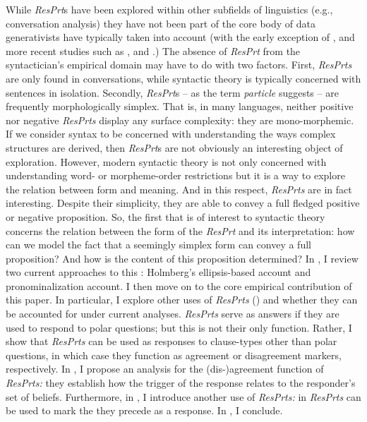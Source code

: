 \documentclass[output=paper]{LSP/langsci}
\begin{document}
While \textit{ResPrt}s have been explored within other subfields of linguistics (e.g., conversation analysis) they have not been part of the core body of data generativists have typically taken into account (with the early exception of \citealt{Pope1976}, and more recent studies such as \citealt{FarkasBruce2009,KramerRawlins2009}, and \citealt{Krifka2013}.) The absence of \textit{ResPrt} from the syntactician’s empirical domain may have to do with two factors. First, \textit{ResPrts} are only found in conversations, while syntactic theory is typically concerned with sentences in isolation. Secondly, \textit{ResPrt}s – as the term \textit{particle} suggests – are frequently morphologically simplex. That is, in many languages, neither positive nor negative \textit{ResPrts} display any surface complexity: they are mono-morphemic.
If we consider syntax to be concerned with understanding the ways complex structures are derived, then \textit{ResPrt}s are not obviously an interesting object of exploration. However, modern syntactic theory is not only concerned with understanding word- or morpheme-order restrictions but it is a way to explore the relation between form and meaning. And in this respect, \textit{ResPrts} are in fact interesting. Despite their  simplicity, they are able to convey a full fledged positive or negative proposition. So, the first  that is of interest to syntactic theory concerns the relation between the form of the \textit{ResPrt} and its interpretation: how can we model the fact that a seemingly simplex form can convey a full proposition? And how is the content of this proposition determined? In , I review two current approaches to this : Holmberg’s ellipsis-based account and  pronominalization account. I then move on to the core empirical contribution of this paper. In particular, I explore other uses of \textit{ResPrts} () and whether they can be accounted for under current analyses. \textit{ResPrts} serve as answers if they are used to respond to polar questions; but this is not their only function. Rather, I show that \textit{ResPrts} can be used as responses to clause-types other than polar questions, in which case they function as agreement or disagreement markers, respectively. In , I propose an analysis for the (dis-)agreement function of \textit{ResPrts:} they establish how the trigger of the response relates to the responder’s set of beliefs. Furthermore, in , I introduce another use of \textit{ResPrts:} in  \textit{ResPrts} can be used to mark the  they precede as a response. 
In , I conclude.
\end{document}
